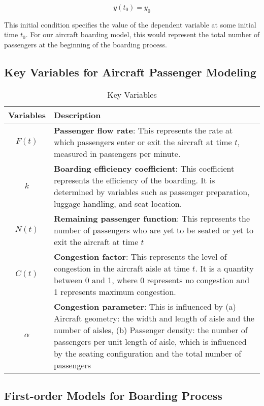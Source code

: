\documentclass[12pt]{article}
\begin{document}
\begin{equation}
y(t_0) = y_0
\end{equation}

This initial condition specifies the value of the dependent variable at some initial time $t_0$. For our aircraft boarding model, this would represent the total number of passengers at the beginning of the boarding process.

\subsection{Key Variables for Aircraft Passenger Modeling}

\begin{table}[H]
\centering
\caption{Key Variables}
\begin{tabular}{cp{12cm}}
\toprule
\textbf{Variables} & \textbf{Description} \\
\midrule
$F(t)$ & \textbf{Passenger flow rate}: This represents the rate at which passengers enter or exit the aircraft at time $t$, measured in passengers per minute. \\
\midrule
$k$ & \textbf{Boarding efficiency coefficient}: This coefficient represents the efficiency of the boarding. It is determined by variables such as passenger preparation, luggage handling, and seat location. \\
\midrule
$N(t)$ & \textbf{Remaining passenger function}: This represents the number of passengers who are yet to be seated or yet to exit the aircraft at time $t$ \\
\midrule
$C(t)$ & \textbf{Congestion factor}: This represents the level of congestion in the aircraft aisle at time $t$. It is a quantity between 0 and 1, where 0 represents no congestion and 1 represents maximum congestion. \\
\midrule
$\alpha$ & \textbf{Congestion parameter}: This is influenced by (a) Aircraft geometry: the width and length of aisle and the number of aisles, (b) Passenger density: the number of passengers per unit length of aisle, which is influenced by the seating configuration and the total number of passengers \\
\bottomrule
\end{tabular}
\end{table}

\subsection{First-order Models for Boarding Process}
\end{document}
